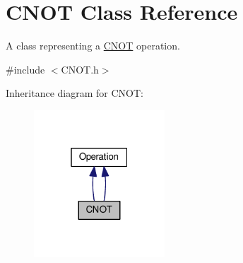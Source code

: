 \hypertarget{class_c_n_o_t}{}\section{C\+N\+OT Class Reference}
\label{class_c_n_o_t}


A class representing a \hyperlink{class_c_n_o_t}{C\+N\+OT} operation.  




{\ttfamily \#include $<$C\+N\+O\+T.\+h$>$}



Inheritance diagram for C\+N\+OT\+:
\nopagebreak
\begin{figure}[H]
\begin{center}
\leavevmode
\includegraphics[width=139pt]{class_c_n_o_t__inherit__graph}
\end{center}
\end{figure}
